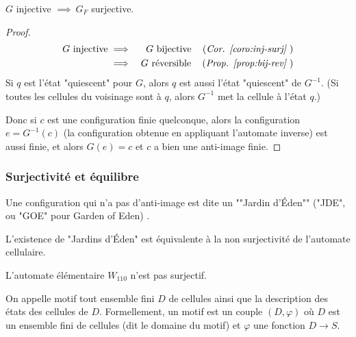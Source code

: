 \begin{coro}
	$G$ injective $\implies \ G_F$ surjective.
\end{coro}


\begin{proof}
	\begin{eqnarray*}
		G \text{ injective} &\implies& G \text{ bijective} \quad\left(\textit{Cor. \ref{coro:inj-surj} }\right)\\
		&\implies& G \text{ réversible} \quad\left(\textit{Prop. \ref{prop:bij-rev} }\right)
	\end{eqnarray*}
	Si $q$ est l'état "quiescent" pour $G$, alors $q$ est aussi l'état "quiescent" de $G^{-1}$.
	(Si toutes les cellules du voisinage sont à $q$, alors $G^{-1}$ met la cellule à l'état $q$.)

	Donc si $c$ est une configuration finie quelconque,  alors la configuration $e = G^{-1}(c)$ (la configuration obtenue en appliquant
	l'automate inverse) est aussi finie, et alors $G(e) = c$ et $c$ a bien une anti-image finie.
\end{proof}




\subsubsection{Surjectivité et équilibre}
\begin{definition}
	Une configuration qui n'a pas d'anti-image est dite un ""Jardin d'Éden"" ("JDE", ou "GOE" pour Garden of Eden) .
\end{definition}

\begin{remarque}
	L'existence de "Jardins d'Éden" est équivalente à la non surjectivité de l'automate cellulaire.
\end{remarque}

\begin{exemple}
	L'automate élémentaire $W_{110}$ n'est pas surjectif.
	\todo{~}
\end{exemple}


\begin{definition}
	On appelle motif tout ensemble fini $D$ de cellules ainsi que la description des états des cellules de $D$. Formellement, un motif est un
	couple $(D, \varphi)$ où $D$ est un ensemble fini de cellules (dit le domaine du motif) et $\varphi$ une fonction $D \to S$.
\end{definition}


